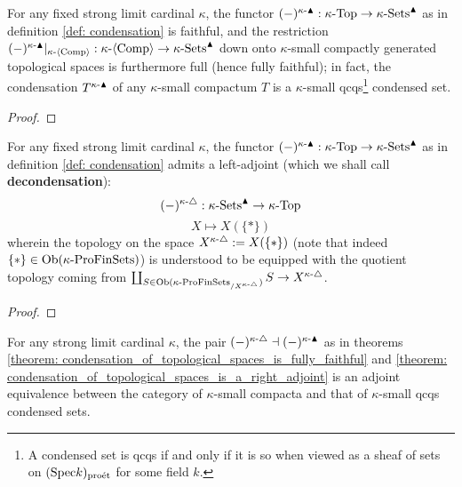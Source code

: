             \begin{theorem} \label{theorem: condensation_of_topological_spaces_is_fully_faithful}
                For any fixed strong limit cardinal $\kappa$, the functor $(-)^{\kappa\text{-}\blacktriangle}: \kappa\text{-}\mathrm{Top} \to \kappa\text{-}\mathrm{Sets}^{\blacktriangle}$ as in definition \ref{def: condensation} is faithful, and the restriction $(-)^{\kappa\text{-}\blacktriangle}|_{\kappa\text{-}\langle\mathrm{Comp}\rangle}: \kappa\text{-}\langle\mathrm{Comp}\rangle \to \kappa\text{-}\mathrm{Sets}^{\blacktriangle}$ down onto $\kappa$-small compactly generated topological spaces is furthermore full (hence fully faithful); in fact, the condensation $T^{\kappa\text{-}\blacktriangle}$ of any $\kappa$-small compactum $T$ is a $\kappa$-small qcqs\footnote{A condensed set is qcqs if and only if it is so when viewed as a sheaf of sets on $(\mathrm{Spec} k)_{\mathrm{pro\acute{e}t}}$ for some field $k$.} condensed set.
            \end{theorem}
                \begin{proof}
                    
                \end{proof}
            \begin{theorem} \label{theorem: condensation_of_topological_spaces_is_a_right_adjoint}
                For any fixed strong limit cardinal $\kappa$, the functor $(-)^{\kappa\text{-}\blacktriangle}: \kappa\text{-}\mathrm{Top} \to \kappa\text{-}\mathrm{Sets}^{\blacktriangle}$ as in definition \ref{def: condensation} admits a left-adjoint (which we shall call \textbf{decondensation}):
                    $$(-)^{\kappa\text{-}\triangle}: \kappa\text{-}\mathrm{Sets}^{\blacktriangle} \to \kappa\text{-}\mathrm{Top}$$
                    $$X \mapsto X(\{*\})$$
                wherein the topology on the space $X^{\kappa\text{-}\triangle} := X(\{*\})$ (note that indeed $\{*\} \in \mathrm{Ob}(\kappa\text{-}\mathrm{Pro}\mathrm{Fin}\mathrm{Sets})$) is understood to be equipped with the quotient topology coming from $\coprod_{S \in \mathrm{Ob}(\kappa\text{-}\mathrm{Pro}\mathrm{Fin}\mathrm{Sets}_{/X^{\kappa\text{-}\triangle}})} S \to X^{\kappa\text{-}\triangle}$.
            \end{theorem}
                \begin{proof}
                    
                \end{proof}
            \begin{corollary}
                For any strong limit cardinal $\kappa$, the pair $(-)^{\kappa\text{-}\triangle} \dashv (-)^{\kappa\text{-}\blacktriangle}$ as in theorems \ref{theorem: condensation_of_topological_spaces_is_fully_faithful} and \ref{theorem: condensation_of_topological_spaces_is_a_right_adjoint} is an adjoint equivalence between the category of $\kappa$-small compacta and that of $\kappa$-small qcqs condensed sets.  
            \end{corollary}
            
